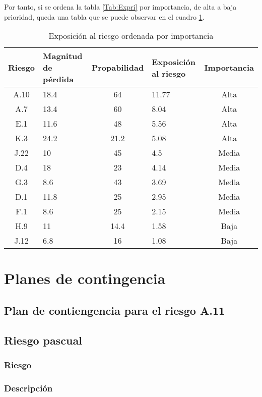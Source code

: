 \documentclass[11pt,a4paper,spanish,twoside]{report}
\begin{document}
Por tanto, si se ordena la tabla \ref{Tab:Expri} por importancia, de alta a
baja prioridad, queda una tabla que se puede observar en el cuadro
\ref{Tab:Expor}.


\begin{table}[!h]
  \centering
  \begin{tabular}{|c||p{}||c||p{}||c|}
    \hline
    \textbf{Riesgo} & \textbf{Magnitud de pérdida} & \textbf{Propabilidad} & 
    \textbf{Exposición al riesgo} & \textbf{Importancia} \\
    \hline \hline
    A.10 & 18.4 & 64 & 11.77 & Alta \\ 
    \hline
    A.7 & 13.4 & 60 & 8.04 & Alta \\
    \hline 
    E.1 & 11.6 & 48 & 5.56 & Alta \\
    \hline
    K.3 & 24.2 & 21.2 & 5.08 & Alta \\
    \hline
    J.22 & 10 & 45 & 4.5 & Media \\
    \hline
    D.4 & 18 & 23 & 4.14 & Media \\
    \hline
    G.3 & 8.6 & 43 & 3.69 & Media \\
    \hline
    D.1 & 11.8 & 25 & 2.95 & Media \\
    \hline
    F.1 & 8.6 & 25 & 2.15 & Media \\
    \hline
    H.9 & 11 & 14.4 & 1.58 & Baja \\
    \hline
    J.12 & 6.8 & 16 & 1.08 & Baja \\
    \hline
  \end{tabular}
  \caption{Exposición al riesgo ordenada por importancia} 
  \label{Tab:Expor}
\end{table}
\chapter{Planes de contingencia}
\section{Plan de contiengencia para el riesgo A.11}
\section{Riesgo pascual}
\subsection{Riesgo}
\subsection{Descripción}
\end{document}
